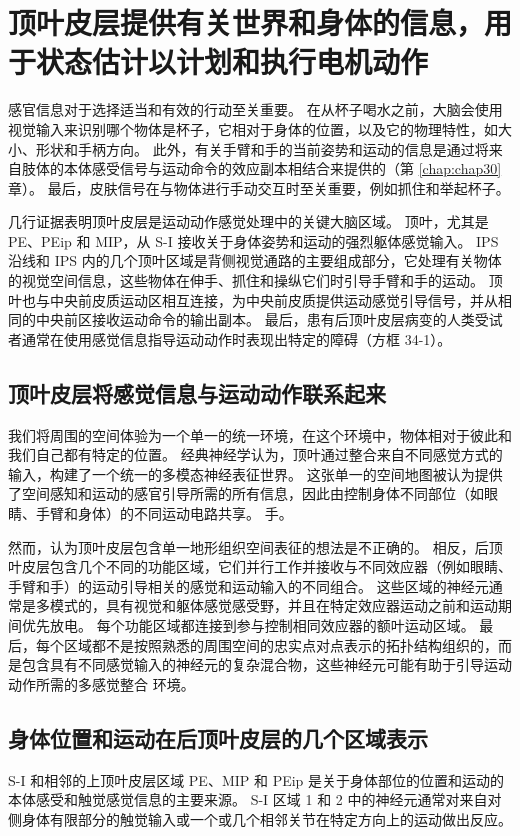 \section{顶叶皮层提供有关世界和身体的信息，用于状态估计以计划和执行电机动作}
感官信息对于选择适当和有效的行动至关重要。 在从杯子喝水之前，大脑会使用视觉输入来识别哪个物体是杯子，它相对于身体的位置，以及它的物理特性，如大小、形状和手柄方向。 此外，有关手臂和手的当前姿势和运动的信息是通过将来自肢体的本体感受信号与运动命令的效应副本相结合来提供的（第 \ref{chap:chap30} 章）。 最后，皮肤信号在与物体进行手动交互时至关重要，例如抓住和举起杯子。

几行证据表明顶叶皮层是运动动作感觉处理中的关键大脑区域。 顶叶，尤其是 PE、PEip 和 MIP，从 S-I 接收关于身体姿势和运动的强烈躯体感觉输入。 IPS 沿线和 IPS 内的几个顶叶区域是背侧视觉通路的主要组成部分，它处理有关物体的视觉空间信息，这些物体在伸手、抓住和操纵它们时引导手臂和手的运动。 顶叶也与中央前皮质运动区相互连接，为中央前皮质提供运动感觉引导信号，并从相同的中央前区接收运动命令的输出副本。 最后，患有后顶叶皮层病变的人类受试者通常在使用感觉信息指导运动动作时表现出特定的障碍（方框 34-1）。


\subsection{顶叶皮层将感觉信息与运动动作联系起来}
我们将周围的空间体验为一个单一的统一环境，在这个环境中，物体相对于彼此和我们自己都有特定的位置。 经典神经学认为，顶叶通过整合来自不同感觉方式的输入，构建了一个统一的多模态神经表征世界。 这张单一的空间地图被认为提供了空间感知和运动的感官引导所需的所有信息，因此由控制身体不同部位（如眼睛、手臂和身体）的不同运动电路共享。 手。

然而，认为顶叶皮层包含单一地形组织空间表征的想法是不正确的。 相反，后顶叶皮层包含几个不同的功能区域，它们并行工作并接收与不同效应器（例如眼睛、手臂和手）的运动引导相关的感觉和运动输入的不同组合。 这些区域的神经元通常是多模式的，具有视觉和躯体感觉感受野，并且在特定效应器运动之前和运动期间优先放电。 每个功能区域都连接到参与控制相同效应器的额叶运动区域。 最后，每个区域都不是按照熟悉的周围空间的忠实点对点表示的拓扑结构组织的，而是包含具有不同感觉输入的神经元的复杂混合物，这些神经元可能有助于引导运动动作所需的多感觉整合 环境。



\subsection{身体位置和运动在后顶叶皮层的几个区域表示}
S-I 和相邻的上顶叶皮层区域 PE、MIP 和 PEip 是关于身体部位的位置和运动的本体感受和触觉感觉信息的主要来源。 S-I 区域 1 和 2 中的神经元通常对来自对侧身体有限部分的触觉输入或一个或几个相邻关节在特定方向上的运动做出反应。

